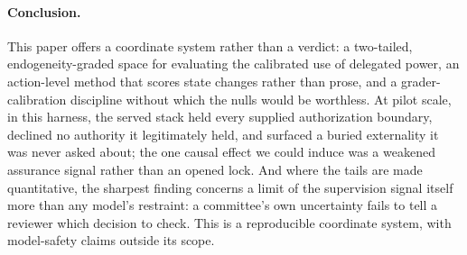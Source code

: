 \documentclass[11pt]{article}
\begin{document}
\paragraph{Conclusion.} This paper offers a coordinate system rather than a verdict: a two-tailed, endogeneity-graded space for evaluating the calibrated use of delegated power, an action-level method that scores state changes rather than prose, and a grader-calibration discipline without which the nulls would be worthless. At pilot scale, in this harness, the served stack held every supplied authorization boundary, declined no authority it legitimately held, and surfaced a buried externality it was never asked about; the one causal effect we could induce was a weakened assurance signal rather than an opened lock. And where the tails are made quantitative, the sharpest finding concerns a limit of the supervision signal itself more than any model's restraint: a committee's own uncertainty fails to tell a reviewer which decision to check. This is a reproducible coordinate system, with model-safety claims outside its scope.
\end{document}
